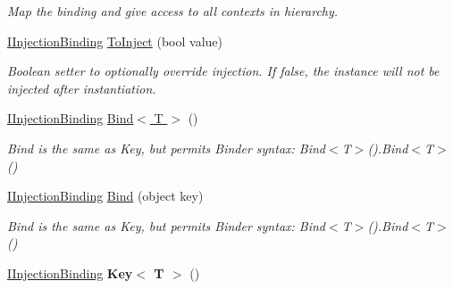 \begin{DoxyCompactItemize}
\begin{DoxyCompactList}\small\item\em Map the binding and give access to all contexts in hierarchy. \end{DoxyCompactList}\item 
\hypertarget{interfacestrange_1_1extensions_1_1injector_1_1api_1_1_i_injection_binding_a372558a435574953af1cb6118306117d}{\hyperlink{interfacestrange_1_1extensions_1_1injector_1_1api_1_1_i_injection_binding}{I\-Injection\-Binding} \hyperlink{interfacestrange_1_1extensions_1_1injector_1_1api_1_1_i_injection_binding_a372558a435574953af1cb6118306117d}{To\-Inject} (bool value)}\label{interfacestrange_1_1extensions_1_1injector_1_1api_1_1_i_injection_binding_a372558a435574953af1cb6118306117d}

\begin{DoxyCompactList}\small\item\em Boolean setter to optionally override injection. If false, the instance will not be injected after instantiation. \end{DoxyCompactList}\item 
\hypertarget{interfacestrange_1_1extensions_1_1injector_1_1api_1_1_i_injection_binding_a69d11f853421b478500e51a1f49ce189}{\hyperlink{interfacestrange_1_1extensions_1_1injector_1_1api_1_1_i_injection_binding}{I\-Injection\-Binding} \hyperlink{interfacestrange_1_1extensions_1_1injector_1_1api_1_1_i_injection_binding_a69d11f853421b478500e51a1f49ce189}{Bind$<$ T $>$} ()}\label{interfacestrange_1_1extensions_1_1injector_1_1api_1_1_i_injection_binding_a69d11f853421b478500e51a1f49ce189}

\begin{DoxyCompactList}\small\item\em Bind is the same as Key, but permits Binder syntax\-: {\ttfamily Bind$<$T$>$().Bind$<$T$>$()} \end{DoxyCompactList}\item 
\hypertarget{interfacestrange_1_1extensions_1_1injector_1_1api_1_1_i_injection_binding_a156db878da329196cb7db46768db3326}{\hyperlink{interfacestrange_1_1extensions_1_1injector_1_1api_1_1_i_injection_binding}{I\-Injection\-Binding} \hyperlink{interfacestrange_1_1extensions_1_1injector_1_1api_1_1_i_injection_binding_a156db878da329196cb7db46768db3326}{Bind} (object key)}\label{interfacestrange_1_1extensions_1_1injector_1_1api_1_1_i_injection_binding_a156db878da329196cb7db46768db3326}

\begin{DoxyCompactList}\small\item\em Bind is the same as Key, but permits Binder syntax\-: {\ttfamily Bind$<$T$>$().Bind$<$T$>$()} \end{DoxyCompactList}\item 
\hypertarget{interfacestrange_1_1extensions_1_1injector_1_1api_1_1_i_injection_binding_a2ba440297e1fb241be2a5977aef2acf0}{\hyperlink{interfacestrange_1_1extensions_1_1injector_1_1api_1_1_i_injection_binding}{I\-Injection\-Binding} {\bfseries Key$<$ T $>$} ()}\label{interfacestrange_1_1extensions_1_1injector_1_1api_1_1_i_injection_binding_a2ba440297e1fb241be2a5977aef2acf0}


\end{DoxyCompactItemize}
